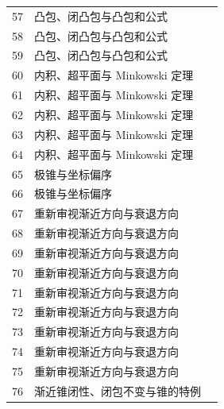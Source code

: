 \documentclass[11pt,a4paper]{article}
\theoremstyle{definition}\newtheorem{definition}{定义}\newtheorem{example}{例}
\begin{document}
\begin{longtable}{r p{.66\linewidth} r}
57 & 凸包、闭凸包与凸包和公式 & \pageref{g:109:55}\\

58 & 凸包、闭凸包与凸包和公式 & \pageref{g:109:55}\\

59 & 凸包、闭凸包与凸包和公式 & \pageref{g:109:55}\\

60 & 内积、超平面与 Minkowski 定理 & \pageref{g:109:60}\\

61 & 内积、超平面与 Minkowski 定理 & \pageref{g:109:60}\\

62 & 内积、超平面与 Minkowski 定理 & \pageref{g:109:60}\\

63 & 内积、超平面与 Minkowski 定理 & \pageref{g:109:60}\\

64 & 内积、超平面与 Minkowski 定理 & \pageref{g:109:60}\\

65 & 极锥与坐标偏序 & \pageref{g:109:65}\\

66 & 极锥与坐标偏序 & \pageref{g:109:65}\\

67 & 重新审视渐近方向与衰退方向 & \pageref{g:109:67}\\

68 & 重新审视渐近方向与衰退方向 & \pageref{g:109:67}\\

69 & 重新审视渐近方向与衰退方向 & \pageref{g:109:67}\\

70 & 重新审视渐近方向与衰退方向 & \pageref{g:109:67}\\

71 & 重新审视渐近方向与衰退方向 & \pageref{g:109:67}\\

72 & 重新审视渐近方向与衰退方向 & \pageref{g:109:67}\\

73 & 重新审视渐近方向与衰退方向 & \pageref{g:109:67}\\

74 & 重新审视渐近方向与衰退方向 & \pageref{g:109:67}\\

75 & 重新审视渐近方向与衰退方向 & \pageref{g:109:67}\\

76 & 渐近锥闭性、闭包不变与锥的特例 & \pageref{g:109:76}\\


\end{longtable}
\end{document}
